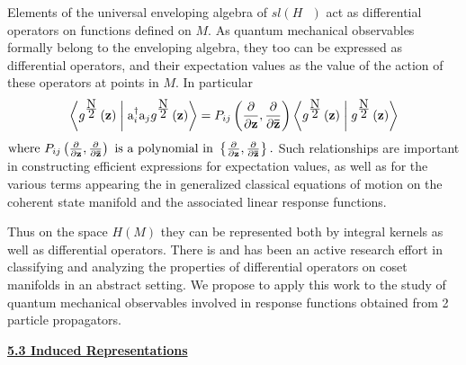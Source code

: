 \documentclass{amsart}
\begin{document}
Elements of the universal enveloping algebra of $sl\left( {H\mbox{ }}
\right)$ act as differential operators on functions defined on $M$. As
quantum mechanical observables formally belong to the enveloping algebra,
they too can be expressed as differential operators, and their expectation
values as the value of the action of these operators at points in $M$. In
particular
\[
\left\langle {g^{\frac{\mbox{N}}{\mbox{2}}}\left( {\rm {\bf z}} \right)}
\mathrel{\left| {\vphantom {{g^{\frac{\mbox{N}}{\mbox{2}}}\left( {\rm {\bf
z}} \right)} {\mbox{a}_i^\dag \mbox{a}_j g^{\frac{\mbox{N}}{\mbox{2}}}\left(
{\rm {\bf z}} \right)}}} \right. \kern-\nulldelimiterspace} {\mbox{a}_i^\dag
\mbox{a}_j g^{\frac{\mbox{N}}{\mbox{2}}}\left( {\rm {\bf z}} \right)}
\right\rangle =P_{ij} \left( {\frac{\partial }{\partial {\rm {\bf
z}}},\frac{\partial }{\partial {\rm {\bf \bar {z}}}}} \right)\left\langle
{g^{\frac{\mbox{N}}{\mbox{2}}}\left( {\rm {\bf z}} \right)} \mathrel{\left|
{\vphantom {{g^{\frac{\mbox{N}}{\mbox{2}}}\left( {\rm {\bf z}} \right)}
{g^{\frac{\mbox{N}}{\mbox{2}}}\left( {\rm {\bf z}} \right)}}} \right.
\kern-\nulldelimiterspace} {g^{\frac{\mbox{N}}{\mbox{2}}}\left( {\rm {\bf
z}} \right)} \right\rangle
\]
$\mbox{where }P_{ij} \left( {\frac{\partial }{\partial {\rm {\bf
z}}},\frac{\partial }{\partial {\rm {\bf \bar {z}}}}} \right)\mbox{ is a
polynomial in }\left\{ {\frac{\partial }{\partial {\rm {\bf
z}}},\frac{\partial }{\partial {\rm {\bf \bar {z}}}}} \right\}.$ Such
relationships are important in constructing efficient expressions for
expectation values, as well as for the various terms appearing the in
generalized classical equations of motion on the coherent state manifold and
the associated linear response functions.

Thus on the space $H\left( M \right)$ they can be represented both by
integral kernels as well as differential operators. There is and has been an
active research effort in classifying and analyzing the properties of
differential operators on coset manifolds in an abstract setting. We propose
to apply this work to the study of quantum mechanical observables involved
in response functions obtained from 2 particle propagators.

\underline {\textbf{5.3 Induced Representations}}
\end{document}
